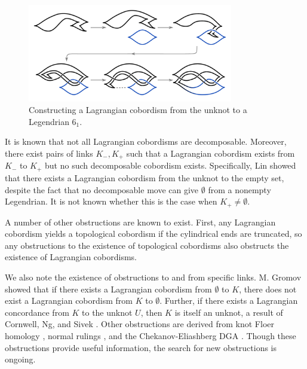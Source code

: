\begin{figure}[ht!]
    \centering
    \includegraphics[width=0.8\textwidth]{images/cobordism-movie--1.pdf}
    \caption{Constructing a Lagrangian cobordism from the unknot to a Legendrian $6_1$.}
    \label{fig:cobordism-construction}
\end{figure}

It is known that not all Lagrangian cobordisms are decomposable. Moreover, there exist pairs of links $K_-, K_+$ such that a Lagrangian cobordism exists from $K_-$ to $K_+$ but no such decomposable cobordism exists. Specifically, Lin showed \cite{lin} that there exists a Lagrangian cobordism from the unknot to the empty set, despite the fact that no decomposable move can give $\emptyset$ from a nonempty Legendrian. It is not known whether this is the case when $K_+ \neq \emptyset$.

A number of other obstructions are known to exist.
First, any Lagrangian cobordism yields a topological cobordism if the cylindrical ends are truncated, so any obstructions to the existence of topological cobordisms also obstructs the existence of Lagrangian cobordisms.

We also note the existence of obstructions to and from specific links. M. Gromov showed \cite{gromov} that if there exists a Lagrangian cobordism from $\emptyset$ to $K$, there does not exist a Lagrangian cobordism from $K$ to $\emptyset$.
Further, if there exists a Lagrangian concordance from $K$ to the unknot $U$, then $K$ is itself an unknot, a result of Cornwell, Ng, and Sivek \cite{cornwell}.
Other obstructions are derived from knot Floer homology \cite{baldwin}, normal rulings \cite{cornwell}, and the Chekanov-Eliashberg DGA \cite{pan}. 
Though these obstructions provide useful information, the search for new obstructions is ongoing.

